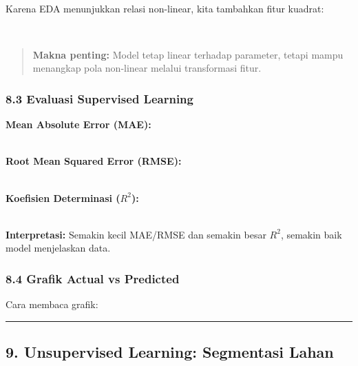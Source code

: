 \documentclass[12pt,a4paper]{article}
\begin{document}
\\[
\hat{y} = \beta_0 + \beta_1 x_1 + \beta_2 x_2 + \dots + \beta_p x_p
\\]


Karena EDA menunjukkan relasi non-linear, kita tambahkan fitur kuadrat:


\\[
\hat{y} = \beta_0 + \beta_1 \cdot \text{rainfall} + \beta_2 \cdot \text{rainfall}^2 + \dots
\\]


\begin{quote}
\textbf{Makna penting:} Model tetap linear terhadap parameter, tetapi mampu menangkap pola non-linear melalui transformasi fitur.\end{quote}


\subsubsection{8.3 Evaluasi Supervised Learning}

\textbf{Mean Absolute Error (MAE):}


\\[
\begin{tabular}{|l|l|}
\hline
\text{MAE} = \frac{1}{n} \sum_{i=1}^{n} & y_i - \hat{y}_i \\
\hline
\end{tabular}
\\]


\textbf{Root Mean Squared Error (RMSE):}


\\[
\text{RMSE} = \sqrt{\frac{1}{n} \sum_{i=1}^{n} (y_i - \hat{y}_i)^2}
\\]


\textbf{Koefisien Determinasi ($R^2$):}


\\[
R^2 = 1 - \frac{SS_{\text{res}}}{SS_{\text{tot}}}
\\]


\textbf{Interpretasi:} Semakin kecil MAE/RMSE dan semakin besar $R^2$, semakin baik model menjelaskan data.


\subsubsection{8.4 Grafik Actual vs Predicted}

Cara membaca grafik:


\hrule


\subsection{9. Unsupervised Learning: Segmentasi Lahan}
\end{document}

